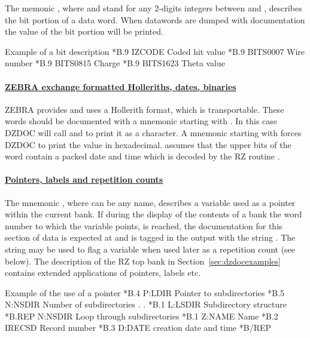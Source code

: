 The memonic , where  and  
stand for any 2-digits integers between  and , 
describes the bit portion of a data word.
When datawords are dumped with documentation the value
of the bit portion will be printed.
 
\begin{XMPt}{Example of a bit description}
*B.9      IZCODE     Coded hit value
*B.9      BITS0007   Wire number
*B.9      BITS0815   Charge
*B.9      BITS1623   Theta value
\end{XMPt}
 
\paragraph{\underline{\bf ZEBRA exchange formatted Holleriths,
dates, binaries}}
ZEBRA provides and uses a Hollerith format, which is transportable.
These words should be documented with a mnemonic starting with
. In this case DZDOC will call  and  to print
it as a character. A mnemonic starting with  forces DZDOC
to print the value in hexadecimal.  assumes that the upper
bits of the word contain a packed date and time which is decoded
by the RZ routine .
 
\paragraph{\underline{\bf Pointers, labels and repetition counts}}
\label{pointer (bank documentation)}
\label{repetition (bank documentation)}
 
The mnemonic , where  can be any name,
describes a variable used as a pointer within the current bank. 
If during the display of 
the contents of a bank the word number to which the variable points, 
is reached, the documentation for this section of data is expected
at  and is tagged in the output with the string .
The string  may be used to flag a variable when 
used later as a repetition count (see below). 
The description of the RZ top bank in Section~\ref{sec:dzdocexamples}
contains extended applications of pointers, labels etc.
 
\begin{XMPt}{Example of the use of a pointer}
*B.4      P:LDIR     Pointer to subdirectories
*B.5      N:NSDIR    Number of subdirectories
.
.
*B.1      L:LSDIR    Subdirectory structure
*B.REP    N:NSDIR    Loop through subdirectories
*B.1      Z:NAME     Name
*B.2      IRECSD     Record number
*B.3      D:DATE     creation date and time
*B/REP
\end{XMPt}
 
